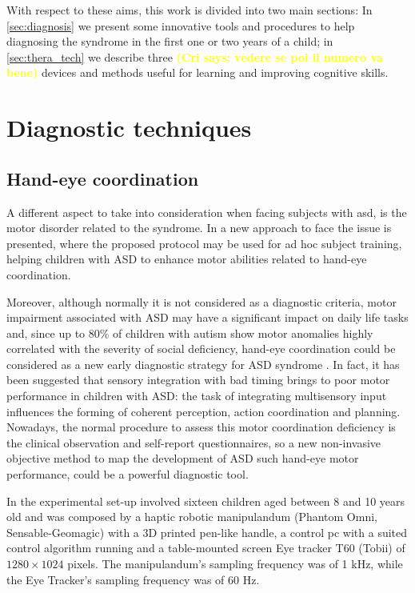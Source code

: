 \documentclass[12pt,journal,draftclsnofoot,onecolumn]{IEEEtran}
\makeatletter
\let\origsubsubsection\subsubsection
\renewcommand\subsubsection{\@ifstar{\starsubsubsection}{\nostarsubsubsection}}
\newcommand\nostarsubsubsection[1]
{\subsubsectionprelude\origsubsubsection{#1}}
\newcommand\subsubsectionprelude{%
  \vspace{6pt}
}
\newcommand{\cri}[1]{\textcolor{yellow}{\textbf{(Cri says: #1)}}}
\makeatother
\begin{document}
With respect to these aims, this work is divided into two main sections: In \autoref{sec:diagnosis} we present some innovative tools and procedures to help diagnosing the syndrome in the first one or two years of a child; in \autoref{sec:thera_tech} we describe three \cri{vedere se poi il numero va bene} devices and methods useful for learning and improving cognitive skills.

\section{Diagnostic techniques}
\label{sec:diagnosis}

\subsection{Hand-eye coordination}
\label{sec:hand_eye}
A different aspect to take into consideration when facing subjects with \gls{asd}, is the motor disorder related to the syndrome. In \cite{Casellato2017} a new approach to face the issue is presented, where the proposed protocol may be used for ad hoc subject training, helping children with ASD to enhance motor abilities related to hand-eye coordination.

Moreover, although normally it is not considered as a diagnostic criteria, motor impairment associated with ASD may have a significant impact on daily life tasks and, since up to 80\% of children with autism show motor anomalies highly correlated with the severity of social deficiency, hand-eye coordination could be considered as a new early diagnostic strategy for ASD syndrome \cite{Casellato2017}. In fact, it has been suggested that sensory integration with bad timing brings to poor motor performance in children with ASD: the task of integrating multisensory input influences the forming of coherent perception, action coordination and planning. Nowadays, the normal procedure to assess this motor coordination deficiency is the clinical observation and self-report questionnaires, so a new non-invasive objective method to map the development of ASD such hand-eye motor performance, could be a powerful diagnostic tool.

\subsubsection{Material and methods}
In \cite{Casellato2017} the experimental set-up involved sixteen children aged between 8 and 10 years old and was composed by a haptic robotic manipulandum (Phantom Omni, Sensable-Geomagic) with a 3D printed pen-like handle, a control pc with a suited control algorithm running and a table-mounted screen Eye tracker T60 (Tobii) of $1280\times1024$ pixels. The manipulandum's sampling frequency was of 1 kHz, while the Eye Tracker's sampling frequency was of 60 Hz.
\end{document}
